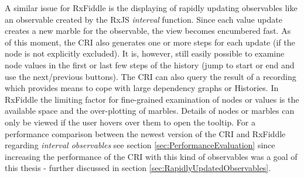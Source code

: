 	A similar issue for RxFiddle is the displaying of rapidly updating observables like an observable created by the RxJS \emph{interval} function. Since each value update creates a new marble for the observable, the view becomes encumbered fast. As of this moment, the CRI also generates one or more steps for each update (if the node is not explicitly excluded). It is, however, still easily possible to examine node values in the first or last few steps of the history (jump to start or end and use the next/previous buttons). The CRI can also query the result of a recording which provides means to cope with large dependency graphs or Histories. In RxFiddle the limiting factor for  fine-grained examination of nodes or values is the available space and the over-plotting of marbles. Details of nodes or marbles can only be viewed if the user hovers over them to open the tooltip. For a performance comparison between the newest version of the CRI and RxFiddle regarding \emph{interval observables} see section \ref{sec:PerformanceEvaluation} since increasing the performance of the CRI with this kind of observables was a goal of this thesis - further discussed in section \ref{sec:RapidlyUpdatedObservables}.
